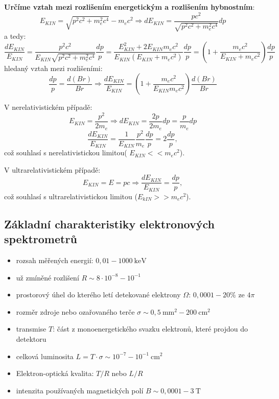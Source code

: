 \documentclass[../../main.tex]{subfiles}
\begin{document}
\textbf{Určíme vztah mezi rozlišením energetickým a rozlišením hybnostním}:
\begin{equation}
E_{KIN} = \sqrt{p^2 c^2 + m_{e}^2 c^4 } - m_e c^2 \Rightarrow dE_{KIN} = \dfrac{pc^2}{\sqrt{p^2 c^2 + m_{e}^2 c^4}}dp
\end{equation}
a tedy:
\begin{equation}
\dfrac{dE_{KIN}}{E_{KIN}} = \dfrac{p^2 c^2}{ E_{KIN} \sqrt{p^2 c^2 + m_{e}^2 c^4}} \dfrac{dp}{p} = \dfrac{E_{KIN}^2 + 2 E_{KIN} m_e c^2}{E_{KIN} (E_{KIN} + m_e c^2)} \dfrac{dp}{p} = \left( 1 + \dfrac{m_e c^2}{E_{KIN} + m_e c^2}\right) \dfrac{dp}{p} 
\end{equation}
hledaný vztah mezi rozlišeními: 
\begin{equation}
\dfrac{dp}{p} = \dfrac{d(Br)}{Br} \Rightarrow \dfrac{dE_{KIN}}{E_{KIN}}= \left( 1 + \dfrac{m_e c^2}{E_{KIN} m_e c^2}\right) \dfrac{d(Br)}{Br}
\end{equation}

V nerelativistickém případě:
\begin{equation}
E_{KIN} = \dfrac{p^2}{2 m_e} \Rightarrow dE_{KIN} = \dfrac{2p}{2 m_e} dp = \dfrac{p}{m_e} dp
\end{equation}
\begin{equation}
\dfrac{dE_{KIN}}{E_{KIN}} = \dfrac{1}{E_{KIN}} \dfrac{p^2}{m_e} \dfrac{dp}{p} = 2 \dfrac{dp}{p},
\end{equation}
což souhlasí s nerelativistickou limitou( $E_{KIN} << m_e c^2$).

V ultrarelativistickém případě:
\begin{equation}
E_{KIN} = E = pc \Rightarrow \dfrac{dE_{KIN}}{E_{KIN}} = \dfrac{dp}{p},
\end{equation}
což souhlasí s ultrarelativistickou limitou ($E_{kIN} >> m_e c^2$).

\subsection{Základní charakteristiky elektronových spektrometrů}

\begin{itemize}
	\item rozsah měřených energií: $0,01 - 1000 ~\mathrm{keV}$
	\item už zmíněné rozlišení $R\sim 8 \cdotp 10^{-8} - 10^{-1}$
	\item prostorový úhel do kterého letí detekované elektrony $\Omega$: $0,0001 - 20 \%$ ze $4 \pi$
	\item rozměr zdroje nebo ozařovaného terče $\sigma\sim 0,5 ~\mathrm{mm^2} - 200 ~\mathrm{cm^2}$
	\item transmise $T$: část z monoenergetického svazku elektronů, které projdou do detektoru
	\item celková luminosita $L = T \cdotp \sigma\sim 10^{-7} - 10^{-1} ~\mathrm{cm^2}$
	\item Elektron-optická kvalita: $T/R$ nebo $L/R$
	\item intenzita používaných magnetických polí $B\sim 0,0001 - 3 ~\mathrm{T}$
\end{itemize}
\end{document}
